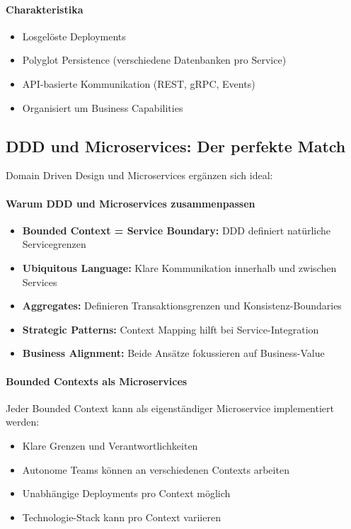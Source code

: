 \paragraph{Charakteristika}
\begin{itemize}
\item Losgelöste Deployments
\item Polyglot Persistence (verschiedene Datenbanken pro Service)
\item API-basierte Kommunikation (REST, gRPC, Events)
\item Organisiert um Business Capabilities
\end{itemize}

\subsection{DDD und Microservices: Der perfekte Match}
\label{subsec:ddd-microservices}

Domain Driven Design und Microservices ergänzen sich ideal:

\paragraph{Warum DDD und Microservices zusammenpassen}
\begin{itemize}
\item \textbf{Bounded Context = Service Boundary:} DDD definiert natürliche Servicegrenzen
\item \textbf{Ubiquitous Language:} Klare Kommunikation innerhalb und zwischen Services
\item \textbf{Aggregates:} Definieren Transaktionsgrenzen und Konsistenz-Boundaries
\item \textbf{Strategic Patterns:} Context Mapping hilft bei Service-Integration
\item \textbf{Business Alignment:} Beide Ansätze fokussieren auf Business-Value
\end{itemize}

\paragraph{Bounded Contexts als Microservices}
Jeder Bounded Context kann als eigenständiger Microservice implementiert werden:
\begin{itemize}
\item Klare Grenzen und Verantwortlichkeiten
\item Autonome Teams können an verschiedenen Contexts arbeiten
\item Unabhängige Deployments pro Context möglich
\item Technologie-Stack kann pro Context variieren
\end{itemize}

